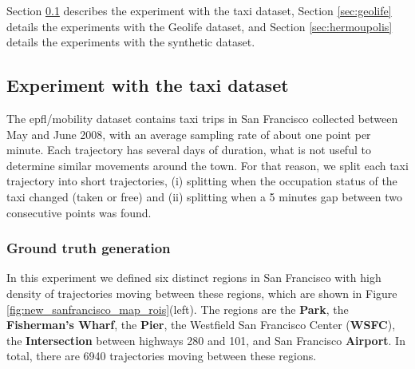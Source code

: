 Section \ref{sec:new_crawdad} describes the experiment with the {taxi} dataset, Section \ref{sec:geolife} details the experiments with the Geolife dataset{, and Section {\ref{sec:hermoupolis}} details the experiments with the synthetic dataset.}

\subsection{Experiment with the {taxi} dataset}\label{sec:new_crawdad}

{The epfl/mobility dataset contains taxi trips in San Francisco collected between May and June 2008, with an average sampling rate of about one point per minute. Each trajectory has several days of duration, what is not useful to determine similar movements around the town. For that reason, we split each taxi trajectory into short trajectories, (i) splitting when the occupation status of the taxi changed (taken or free) and (ii) splitting when a 5 minutes gap between two consecutive points was found.}

\subsubsection{Ground truth generation}
{In this experiment we defined six distinct regions in San Francisco with high density of trajectories moving between these regions, which are shown in Figure {\ref{fig:new_sanfrancisco_map_rois}}(left). The regions are the \textbf{Park}, the \textbf{Fisherman's Wharf}, the \textbf{Pier}, the Westfield San Francisco Center (\textbf{WSFC}), the \textbf{Intersection} between highways 280 and 101, and San Francisco \textbf{Airport}. In total, there are 6940 trajectories moving between these regions.}

